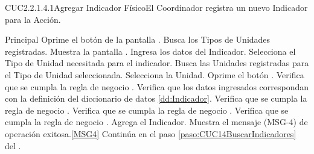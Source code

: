 	\begin{UseCase}{CUC2.2.1.4.1}{Agregar Indicador Físico}{El Coordinador registra un nuevo Indicador para la Acción.}
	\end{UseCase}

	\begin{UCtrayectoria}{Principal}
			\UCpaso[\UCactor] Oprime el botón  de la pantalla .
			\UCpaso Busca los Tipos de Unidades registradas.
			\UCpaso Muestra la pantalla .
			\UCpaso [\UCactor] Ingresa los datos del Indicador.\label{paso:CUC1.4.1ingresaDatosIndicador}
			\UCpaso [\UCactor] Selecciona el Tipo de Unidad necesitada para el indicador.
			\UCpaso Busca las Unidades registradas para el Tipo de Unidad seleccionada.\label{paso:CUC141buscaUnidades}
			\UCpaso [\UCactor] Selecciona la Unidad.
			\UCpaso [\UCactor] Oprime el botón .\label{paso:CUCagregarIndicador}
			\UCpaso Verifica que se cumpla la regla de negocio . 
			\UCpaso Verifica que los datos ingresados correspondan  con la definición del diccionario de datos \ref{dd:Indicador}. 
			\UCpaso Verifica que se cumpla la regla de negocio .
			\UCpaso Verifica que se cumpla la regla de negocio .
			\UCpaso Verifica que se cumpla la regla de negocio .
			\UCpaso Agrega el Indicador.
			\UCpaso Muestra el mensaje (MSG-4) de operación exitosa.\ref{MSG4}
			\UCpaso Continúa en el paso \ref{paso:CUC14BuscarIndicadores} del .
	\end{UCtrayectoria}

